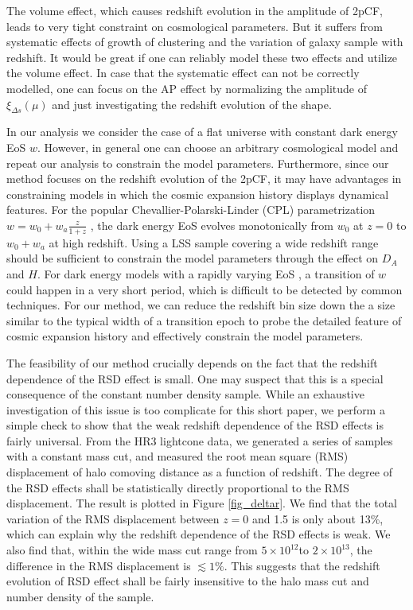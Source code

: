 \documentclass[useAMS,usenatbib]{mn2e}
\newcommand{\hMsun}{{\ifmmode{h^{-1}{\rm
        {M_{\odot}}}}\else{$h^{-1}{\rm{M_{\odot}}}$~}\fi}}
\begin{document}
The volume effect, which causes redshift evolution in the amplitude of 2pCF,
leads to very tight constraint on cosmological parameters.
But it suffers from systematic effects of growth of clustering and the variation of galaxy sample with redshift.
It would be great if one can reliably model these two effects and utilize the volume effect.
In case that the systematic effect can not be correctly modelled,
one can focus on the AP effect by normalizing the amplitude of $\xi_{\Delta s}(\mu)$ and just investigating the redshift evolution of the shape.

In our analysis we consider the case of a flat universe with constant dark energy EoS $w$. 
However, in general one can choose an arbitrary cosmological model and repeat our analysis to constrain the model parameters. 
Furthermore, since our method focuses on the redshift evolution of the 2pCF, 
it may have advantages in constraining models in which the cosmic expansion history displays dynamical features. 
For the popular Chevallier-Polarski-Linder (CPL) parametrization $w=w_0+w_a \frac{z}{1+z}$ \citep{CP2001,Linder2003}, 
the dark energy EoS evolves monotonically from $w_0$ at $z=0$ to $w_0+w_a$ at high redshift. 
Using a LSS sample covering a wide redshift range should be sufficient to constrain the model parameters through the effect on $D_A$ and $H$. 
For dark energy models with a rapidly varying EoS \citep{Bassett2002,Corasaniti2003}, 
a transition of $w$ could happen in a very short period, which is difficult to be detected by common techniques. 
For our method, we can reduce the redshift bin size down the a size similar to the typical width of a transition epoch 
to probe the detailed feature of cosmic expansion history and effectively constrain the model parameters.



The feasibility of our method crucially depends on the fact that the redshift dependence of the RSD effect is small. 
One may suspect that this is a special consequence of the constant number density sample. 
While an exhaustive investigation of this issue is too complicate for this short paper, 
we perform a simple check to show that the weak redshift dependence of the RSD effects is fairly universal. 
From the HR3 lightcone data, we generated a series of samples with a constant mass cut, 
and measured the root mean square (RMS) displacement of halo comoving distance as a function of redshift. 
The degree of the RSD effects shall be statistically directly proportional to the RMS displacement. 
The result is plotted in Figure \ref{fig_deltar}.
We find that the total variation of the RMS displacement between $z=0$ and 1.5 is only about 13\%, which can explain why the redshift dependence of the RSD effects is weak.
We also find that, within the wide mass cut range from $5\times 10^{12}$\hMsun to $2\times 10^{13}$\hMsun, the difference in the RMS displacement is $\lesssim1\%$. 
This suggests that the redshift evolution of RSD effect shall be fairly insensitive to the halo mass cut and number density of the sample.
\end{document}
